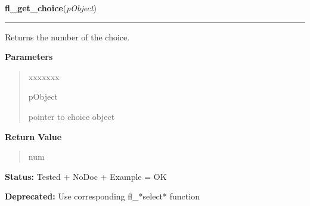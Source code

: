 \hspace{.8\funcindent}\begin{boxedminipage}{\funcwidth}

    \raggedright \textbf{fl\_get\_choice}(\textit{pObject})

    \vspace{-1.5ex}

    \rule{\textwidth}{0.5\fboxrule}
\setlength{\parskip}{2ex}
    Returns the number of the choice.

\setlength{\parskip}{1ex}
      \textbf{Parameters}
      \vspace{-1ex}

      \begin{quote}
        \begin{Ventry}{xxxxxxx}

          \item[pObject]

          pointer to choice object

        \end{Ventry}

      \end{quote}

      \textbf{Return Value}
    \vspace{-1ex}

      \begin{quote}
      num

      \end{quote}

\textbf{Status:} Tested + NoDoc + Example = OK



\textbf{Deprecated:} Use corresponding fl\_*select* function



    \end{boxedminipage}

    \label{xformslib:library:fl_get_choice_item_text}

    \vspace{0.5ex}

